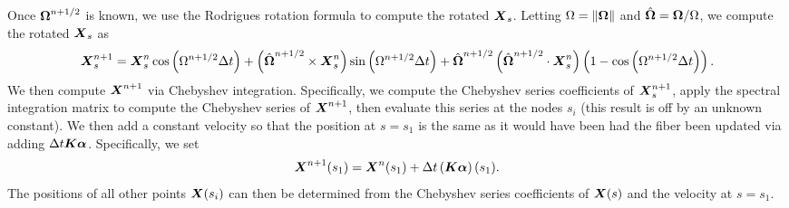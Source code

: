 Once $\boldsymbol{\Omega}^{n+1/2}$ is known, we use the Rodrigues rotation formula \cite{rodrigues1840lois} to compute the rotated $\boldsymbol{X}_s$. Letting $\Omega = \left\Vert \boldsymbol{\Omega}\right\Vert$ and $\hat{\boldsymbol{\Omega}}=\boldsymbol{\Omega}/\Omega$, we compute the rotated $\boldsymbol{X}_s$ as
\begin{equation}
\boldsymbol{X}_s^{n+1} = \boldsymbol{X}_s^n \cos{\left(\Omega^{n+1/2}\Delta t\right)} + \left(\hat{\boldsymbol{\Omega}}^{n+1/2} \times \boldsymbol{X}_s^n \right)  \sin{\left(\Omega^{n+1/2}\Delta t\right)}+\hat{\boldsymbol{\Omega}}^{n+1/2}\left(\hat{\boldsymbol{\Omega}}^{n+1/2} \cdot \boldsymbol{X}_s^n\right)\left(1-\cos{\left(\Omega^{n+1/2}\Delta t\right)}\right).
\end{equation}
 We then compute $\boldsymbol{X}^{n+1}$ via Chebyshev integration. Specifically, we compute the Chebyshev series coefficients of $\boldsymbol{X}_s^{n+1}$, apply the spectral integration matrix \cite{greengard1991spectral} to compute the Chebyshev series of $\boldsymbol{X}^{n+1}$, then evaluate this series at the nodes $s_i$ (this result is off by an unknown constant). We then add a constant velocity so that the position at $s=s_1$ is the same as it would have been had the fiber been updated via adding $\Delta t \boldsymbol{K}\boldsymbol{\alpha}$. Specifically, we set
\begin{equation}
\boldsymbol{X}^{n+1}(s_1) = \boldsymbol{X}^n(s_1) + \Delta t \left(\boldsymbol{K}\boldsymbol{\alpha}\right)(s_1). 
\end{equation}
The positions of all other points $\boldsymbol{X}(s_i)$ can then be determined from the Chebyshev series coefficients of $\boldsymbol{X}(s)$ and the velocity at $s=s_1$. 